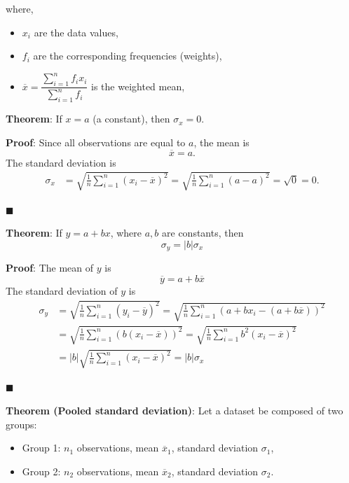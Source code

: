 \documentclass[twoside]{book}
\begin{document}
\begin{enumerate}
where,
\begin{itemize}
    \item \(x_i\) are the data values,
    \item \(f_i\) are the corresponding frequencies (weights),
    \item \(\overline{x} = \dfrac{\sum_{i=1}^n f_i x_i}{\sum_{i=1}^n f_i}\) is the weighted mean,
\end{itemize}

\begin{textbox}
\textbf{Theorem}: If \( x = a \) (a constant), {then } \( \sigma_x = 0 \).
\end{textbox}

\textbf{Proof}: Since all observations are equal to \( a \), the mean is
\[
\overline{x} = a.
\]
The standard deviation is
\begin{align*}
\sigma_x &= \sqrt{\frac{1}{n} \sum_{i=1}^n (x_i - \overline{x})^2} = \sqrt{\frac{1}{n} \sum_{i=1}^n (a - a)^2} = \sqrt{0} = 0.
\end{align*}

\hfill $\blacksquare$

\begin{textbox}
\textbf{Theorem}: If \( y = a + b x \), {where} \( a, b \) {are constants, then}
\[
\sigma_y = |b| \sigma_x
\]
\end{textbox}

\textbf{Proof}: The mean of \( y \) is
\[
\overline{y} = a + b \overline{x}
\]
The standard deviation of \( y \) is
\begin{align*}
\sigma_y &= \sqrt{\frac{1}{n} \sum_{i=1}^n (y_i - \overline{y})^2} = \sqrt{\frac{1}{n} \sum_{i=1}^n (a + b x_i - (a + b \overline{x}))^2} \\
         &= \sqrt{\frac{1}{n} \sum_{i=1}^n \left(b (x_i - \overline{x})\right)^2} = \sqrt{\frac{1}{n} \sum_{i=1}^n b^2 (x_i - \overline{x})^2} \\
         &= |b| \sqrt{\frac{1}{n} \sum_{i=1}^n (x_i - \overline{x})^2} = |b| \sigma_x
\end{align*}

\hfill $\blacksquare$

\begin{textbox}
\textbf{Theorem (Pooled standard deviation)}: Let a dataset be composed of two groups:

\begin{itemize}
  \item Group 1: \( n_1 \) observations, mean \( \overline{x}_1 \), standard deviation \( \sigma_1 \),
  \item Group 2: \( n_2 \) observations, mean \( \overline{x}_2 \), standard deviation \( \sigma_2 \).
\end{itemize}


\end{textbox}
\end{enumerate}
\end{document}
